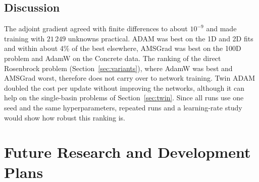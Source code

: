\documentclass[11pt,a4paper]{article}
\begin{document}
\FloatBarrier
\subsection{Discussion}
\label{sec:ann:discussion}
The adjoint gradient agreed with finite differences to about $10^{-9}$ and made training with $21\,249$ unknowns practical. ADAM was best on the 1D and 2D fits and within about 4\% of the best elsewhere, AMSGrad was best on the 100D problem and AdamW on the Concrete data. The ranking of the direct Rosenbrock problem (Section~\ref{sec:variants}), where AdamW was best and AMSGrad worst, therefore does not carry over to network training. Twin ADAM doubled the cost per update without improving the networks, although it can help on the single-basin problems of Section~\ref{sec:twin}. Since all runs use one seed and the same hyperparameters, repeated runs and a learning-rate study would show how robust this ranking is.


\section{Future Research and Development Plans}
\end{document}
